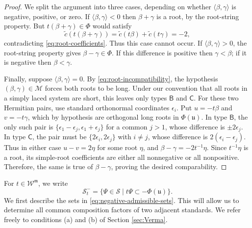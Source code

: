 \documentclass[12pt]{amsart}
\theoremstyle{definition}
\numberwithin{equation}{section}
\newcommand{\m}{\mathfrak m}
\newcommand{\W}{\mathscr W}
\begin{document}
\begin{proof}
We split the argument into three cases, depending on whether
$\langle\beta,\gamma\rangle$ is negative, positive, or zero. If $\langle\beta,\gamma\rangle<0$ then
$\beta+\gamma$ is a root, by the root-string property. But $t(\beta+\gamma)\in\Phi$ would satisfy
\[
 \tilde{c}(t(\beta+\gamma))=\tilde{c}(t\beta)+\tilde{c}(t\gamma)=-2,
\]
contradicting \eqref{eq:root-coefficients}. Thus this case cannot occur. If $\langle\beta,\gamma\rangle>0$, the root-string property gives
$\beta-\gamma\in\Phi$. If this difference is positive then
$\gamma<\beta$; if it is negative then $\beta<\gamma$.

Finally, suppose $\langle\beta,\gamma\rangle=0$.
By \eqref{eq:root-incompatibility}, the hypothesis
$(\beta,\gamma)\in\mathscr M$ forces both roots to be long.
Under our convention that all roots in a simply laced system are
short, this leaves only types $\mathsf B$ and $\mathsf C$.
For these two Hermitian pairs, use standard orthonormal
coordinates $\epsilon_i$. Put $u=-t\beta$ and
$v=-t\gamma$, which by hypothesis are orthogonal long roots in $\Phi(\mathfrak{u})$.
In type $\mathsf{B}$, the only such pair is
$\{\epsilon_1-\epsilon_j,\epsilon_1+\epsilon_j\}$ for a common
$j>1$, whose difference is $\pm2\epsilon_j$.
In type $\mathsf{C}$, the pair must be $\{2\epsilon_i,2\epsilon_j\}$ with $i\ne j$,
whose difference is $2(\epsilon_i-\epsilon_j)$.
Thus in either case $u-v=2\eta$ for some root $\eta$, and $\beta-\gamma=-2t^{-1}\eta$.
Since $t^{-1}\eta$ is a root, its simple-root coefficients are
either all nonnegative or all nonpositive. Therefore, the same is true of
$\beta-\gamma$, proving the desired comparability.
\end{proof}

For $t\in\W^{\m}$, we write
\begin{equation}\label{eq:negative-admissible-sets}
 \mathscr S_t^-=
 \{\Psi\in\mathscr S \mid t\Psi\subset-\Phi(\mathfrak{u})\}.
\end{equation}
We first describe the sets in \eqref{eq:negative-admissible-sets}.
This will allow us to determine all common composition factors of
two adjacent standards. We refer freely to conditions (a) and (b) of Section \ref{sec:Verma}.
\end{document}
